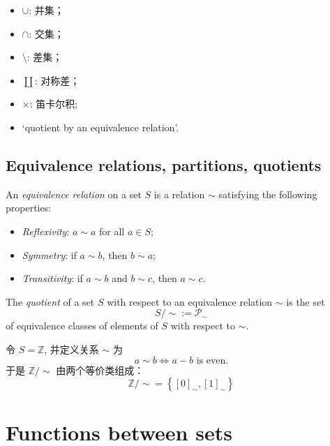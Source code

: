 \begin{itemize}
    \item \(\cup\): 并集；
    \item \(\cap\): 交集；
    \item \(\setminus\): 差集；
    \item \(\coprod\): 对称差；
    \item \(\times\): 笛卡尔积;
    \item `quotient by an equivalence relation'.
\end{itemize}

\subsection{Equivalence relations, partitions, quotients}\label{sec:1.1.4}

\begin{definition}\label{def:equivalence_relation}
    An \emph{equivalence relation} on a set \(S\) is a relation \(\sim\) satisfying the following properties:
    \begin{itemize}
        \item \emph{Reflexivity}: \(a \sim a\) for all \(a \in S\);
        \item \emph{Symmetry}: if \(a \sim b\), then \(b \sim a\);
        \item \emph{Transitivity}: if \(a \sim b\) and \(b \sim c\), then \(a \sim c\).
    \end{itemize}
\end{definition}

\begin{definition}[Quotient]\label{def:quotient}
    The \emph{quotient} of a set \(S\) with respect to an equivalence relation \(\sim\) is the set
    \[
        S / \sim := \mathscr{P}_{\sim }
    \]
    of equivalence classes of elements of \(S\) with respect to \(\sim\).
\end{definition}
\begin{eg}\label{eg:1.1.3}
    令 \(S = \mathbb{Z}\), 并定义关系 \(\sim \) 为
    \[
        a \sim b \iff a - b \text{ is even}.
    \]
    于是 \(\mathbb{Z} / \sim \) 由两个等价类组成：
    \[\mathbb{Z} / \sim  = \left\{[0]_{\sim }, [1]_{\sim } \right\}\]
\end{eg}

\section{Functions between sets}\label{sec:1.2}

